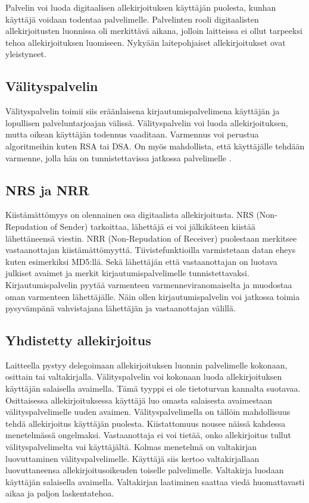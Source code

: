 \documentclass[finnish]{tktltiki2}
\theoremstyle{definition}
\theoremstyle{remark}
\begin{document}
Palvelin voi luoda digitaalisen allekirjoituksen käyttäjän puolesta, kunhan käyttäjä voidaan todentaa palvelimelle. Palvelinten rooli digitaalisten allekirjoitusten luonnissa oli merkittävä aikana, jolloin laitteissa ei ollut tarpeeksi tehoa allekirjoituksen luomiseen. Nykyään laitepohjaiset allekirjoitukset ovat yleistyneet. \cite{proxy}

\subsection{Välityspalvelin}

Välityspalvelin toimii siis eräänlaisena kirjautumispalvelimena käyttäjän ja lopullisen palveluntarjoajan välissä. Välityspalvelin voi luoda allekirjoituksen, mutta oikean käyttäjän todennus vaaditaan. Varmennus voi perustua algoritmeihin kuten RSA tai DSA. On myös mahdollista, että käyttäjälle tehdään varmenne, jolla hän on tunnistettavissa jatkossa palvelimelle \cite{proxy}.

\subsection{NRS ja NRR}

Kiistämättömyys on olennainen osa digitaalista allekirjoitusta. NRS (Non-Repudation of Sender) tarkoittaa, lähettäjä ei voi jälkikäteen kiistää lähettäneensä viestin. NRR (Non-Repudation of Receiver) puolestaan merkitsee vastaanottajan kiistämättömyyttä. Tiivistefunktioilla varmistetaan datan eheys kuten esimerkiksi MD5:llä. Sekä lähettäjän että vastaanottajan on luotava julkiset avaimet ja merkit kirjautumispalvelimelle tunnistettavaksi. Kirjautumispalvelin pyytää varmenteen varmenneviranomaiselta ja muodostaa oman varmenteen lähettäjälle. Näin ollen kirjautumispalvelin voi jatkossa toimia pysyvämpänä vahvistajana lähettäjän ja vastaanottajan välillä. \cite{gene}

\subsection{Yhdistetty allekirjoitus}

Laitteella pystyy delegoimaan allekirjoituksen luonnin palvelimelle kokonaan, osittain tai valtakirjalla. Välityspalvelin voi kokonaan luoda allekirjoituksen käyttäjän salaisella avaimella. Tämä tyyppi ei ole tietoturvan kannalta suotavaa. Osittaisessa allekirjoituksessa käyttäjä luo omasta salaisesta avaimestaan välityspalvelimelle uuden avaimen. Välityspalvelimella on tällöin mahdollisuus tehdä allekirjoitus käyttäjän puolesta. Kiistattomuus nousee näissä kahdessa menetelmässä ongelmaksi. Vastaanottaja ei voi tietää, onko allekirjoitus tullut välityspalvelimelta vai käyttäjältä. Kolmas menetelmä on valtakirjan luovuttaminen välityspalvelimelle. Käyttäjä siis kertoo valtakirjallaan luovuttaneensa allekirjoitusoikeuden toiselle palvelimelle. Valtakirja luodaan käyttäjän salaisella avaimella. Valtakirjan laatiminen saattaa viedä huomattavasti aikaa ja paljon laskentatehoa. \cite{joint}
\end{document}
